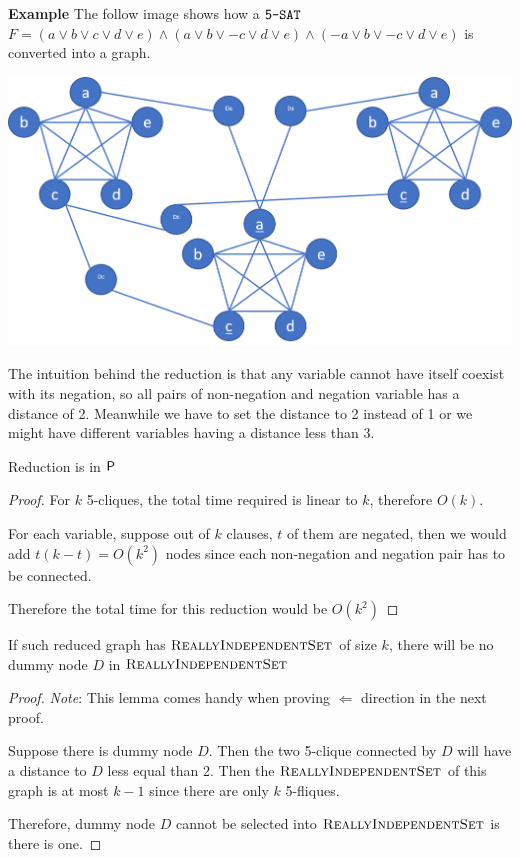 \textbf{Example} The follow image shows how a $\fSAT$ $F = (a \vee b \vee c \vee d \vee e) \wedge (a \vee b \vee -c \vee d \vee e) \wedge (-a \vee b \vee -c \vee d \vee e)$ is converted into a graph.

\includegraphics[width = \textwidth]{Ex1.png}

The intuition behind the reduction is that any variable cannot have itself coexist with its negation, so all pairs of non-negation and negation variable has a distance of 2. 
Meanwhile we have to set the distance to 2 instead of 1 or we might have different variables having a distance less than 3.

\begin{theorem}
    Reduction is in $\P$
\end{theorem}

\begin{proof}
    For $k$ 5-cliques, the total time required is linear to $k$, therefore $O(k)$.

    For each variable, suppose out of $k$ clauses, $t$ of them are negated, then we would add $t(k-t) = O(k^2)$ nodes since each non-negation and negation pair has to be connected.

    Therefore the total time for this reduction would be $O(k^2)$
\end{proof}


\begin{lemma}
    If such reduced graph has $\RIS$ of size $k$, there will be no dummy node $D$ in $\RIS$
\end{lemma}

\begin{proof}
    \textit{Note}: This lemma comes handy when proving $\Leftarrow$ direction in the next proof. 

    Suppose there is dummy node $D$. 
    Then the two 5-clique connected by $D$ will have a distance to $D$ less equal than 2. 
    Then the $\RIS$ of this graph is at most $k-1$ since there are only $k$ 5-fliques.

    Therefore, dummy node $D$ cannot be selected into $\RIS$ is there is one.
\end{proof}

